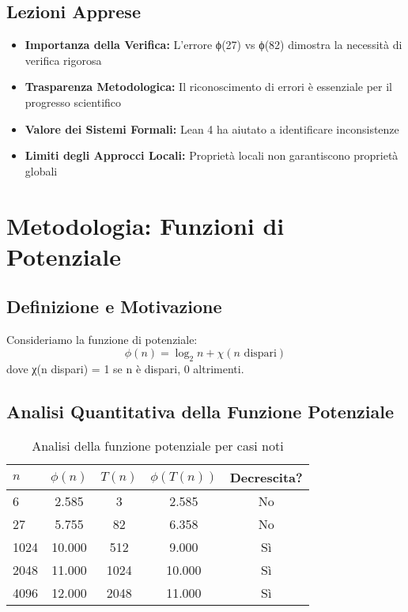\documentclass[11pt,a4paper]{article}
\begin{document}
\subsection{Lezioni Apprese}

\begin{itemize}
\item \textbf{Importanza della Verifica:} L'errore ϕ(27) vs ϕ(82) dimostra la necessità di verifica rigorosa
\item \textbf{Trasparenza Metodologica:} Il riconoscimento di errori è essenziale per il progresso scientifico
\item \textbf{Valore dei Sistemi Formali:} Lean 4 ha aiutato a identificare inconsistenze
\item \textbf{Limiti degli Approcci Locali:} Proprietà locali non garantiscono proprietà globali
\end{itemize}

\section{Metodologia: Funzioni di Potenziale}

\subsection{Definizione e Motivazione}

Consideriamo la funzione di potenziale:
\begin{equation}
\phi(n) = \log_2 n + \chi(n \text{ dispari})
\end{equation}
dove χ(n dispari) = 1 se n è dispari, 0 altrimenti.

\subsection{Analisi Quantitativa della Funzione Potenziale}

\begin{table}[h]
\centering
\caption{Analisi della funzione potenziale per casi noti}
\begin{tabular}{@{}lcccc@{}}
\toprule
$n$ & $\phi(n)$ & $T(n)$ & $\phi(T(n))$ & Decrescita? \\
\midrule
6 & 2.585 & 3 & 2.585 & No \\
27 & 5.755 & 82 & 6.358 & No \\
1024 & 10.000 & 512 & 9.000 & Sì \\
2048 & 11.000 & 1024 & 10.000 & Sì \\
4096 & 12.000 & 2048 & 11.000 & Sì \\
\bottomrule
\end{tabular}
\end{table}
\end{document}
